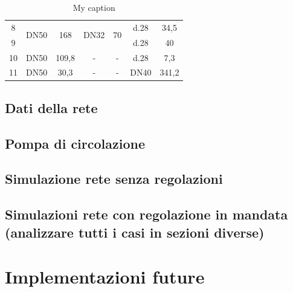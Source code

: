 \documentclass[laurea,oneside,11pt]{USiena_tesiLM}
\begin{document}
\begin{table}[]
{\begin{tabular}{|c|c|c|c|c|c|c|}
8                                             & \multirow{2}{*}{DN50} & \multirow{2}{*}{168}                   & \multirow{2}{*}{DN32}     & \multirow{2}{*}{70}   & d.28         & 34,5                      \\ \cline{1-1} \cline{6-7} 
9                                             &                       &                                        &                           &                       & d.28         & 40                        \\ \hline
10                                            & DN50                  & 109,8                                  & -                         & -                     & d.28         & 7,3                       \\ \hline
11                                            & DN50                  & 30,3                                   & -                         & -                     & DN40         & 341,2                     \\ \hline
\end{tabular}}
\caption{My caption}
\label{tab:rete_ippolito}
\end{table}



\subsection{Dati della rete}

\subsection{Pompa di circolazione}

\subsection{Simulazione rete senza regolazioni}

\subsection{Simulazioni rete con regolazione in mandata (analizzare tutti i casi in sezioni diverse)}

\section{Implementazioni future}
\end{document}
